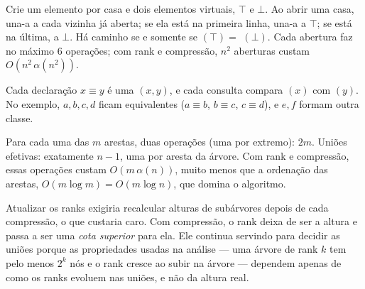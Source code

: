  Crie um elemento por casa e dois elementos virtuais, $\top$ e $\bot$. Ao abrir uma casa, una-a a cada vizinha já aberta; se ela está na primeira linha, una-a a $\top$; se está na última, a $\bot$. Há caminho se e somente se \Find$(\top)=$ \Find$(\bot)$. Cada abertura faz no máximo 6 operações; com rank e compressão, $n^2$ aberturas custam $O(n^2\,\alpha(n^2))$.

 Cada declaração $x\equiv y$ é uma \Union$(x,y)$, e cada consulta compara \Find$(x)$ com \Find$(y)$. No exemplo, $a,b,c,d$ ficam equivalentes ($a\equiv b$, $b\equiv c$, $c\equiv d$), e $e,f$ formam outra classe.

 Para cada uma das $m$ arestas, duas operações \Find{} (uma por extremo): $2m$. Uniões efetivas: exatamente $n-1$, uma por aresta da árvore. Com rank e compressão, essas operações custam $O(m\,\alpha(n))$, muito menos que a ordenação das arestas, $O(m\log m)=O(m\log n)$, que domina o algoritmo.

 Atualizar os ranks exigiria recalcular alturas de subárvores depois de cada compressão, o que custaria caro. Com compressão, o rank deixa de ser a altura e passa a ser uma \emph{cota superior} para ela. Ele continua servindo para decidir as uniões porque as propriedades usadas na análise --- uma árvore de rank $k$ tem pelo menos $2^k$ nós e o rank cresce ao subir na árvore --- dependem apenas de como os ranks evoluem nas uniões, e não da altura real.
